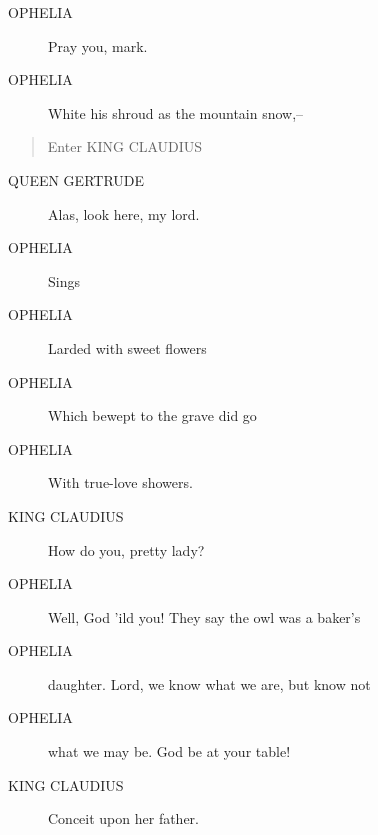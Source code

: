 \documentclass{article}
\begin{document}
\begin{description}
            
\item[OPHELIA] Pray you, mark.
\item[OPHELIA] White his shroud as the mountain snow,--
\end{description}
          
\begin{quote}
Enter KING CLAUDIUS
\end{quote}
          
\begin{description}
            
\item[QUEEN GERTRUDE] Alas, look here, my lord.
\end{description}
          
\begin{description}
            
\item[OPHELIA] 
               Sings
            
\item[OPHELIA] Larded with sweet flowers
\item[OPHELIA] Which bewept to the grave did go
\item[OPHELIA] With true-love showers.
\end{description}
          
\begin{description}
            
\item[KING CLAUDIUS] How do you, pretty lady?
\end{description}
          
\begin{description}
            
\item[OPHELIA] Well, God 'ild you! They say the owl was a baker's
\item[OPHELIA] daughter. Lord, we know what we are, but know not
\item[OPHELIA] what we may be. God be at your table!
\end{description}
          
\begin{description}
            
\item[KING CLAUDIUS] Conceit upon her father.
\end{description}
          
\end{document}
